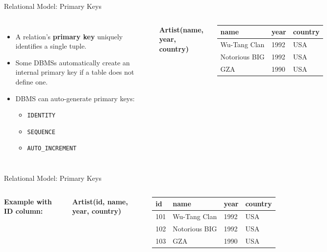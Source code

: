 \begin{frame}{Relational Model: Primary Keys}
    \begin{columns}
        \begin{itemize}
            \item A relation's \textbf{primary key} uniquely identifies a single tuple.
            \item Some DBMSs automatically create an internal primary key if a table does not define one.
            \item DBMS can auto-generate primary keys:
            \begin{itemize}
                \item \texttt{IDENTITY}
                \item \texttt{SEQUENCE}
                \item \texttt{AUTO\_INCREMENT}
            \end{itemize}
        \end{itemize}

        \small
        \textbf{Artist(name, year, country)}
        \begin{table}
        \begin{tabular}{lll}
        \toprule
        name & year & country \\
        \midrule
        Wu-Tang Clan & 1992 & USA \\
        Notorious BIG & 1992 & USA \\
        GZA & 1990 & USA \\
        \bottomrule
        \end{tabular}
        \end{table}
    \end{columns}
\end{frame}

\begin{frame}{Relational Model: Primary Keys}
    \begin{columns}
        \textbf{Example with ID column:}

        \small
        \textbf{Artist(id, name, year, country)}
        \begin{table}
        \begin{tabular}{llll}
        \toprule
        id & name & year & country \\
        \midrule
        101 & Wu-Tang Clan & 1992 & USA \\
        102 & Notorious BIG & 1992 & USA \\
        103 & GZA & 1990 & USA \\
        \bottomrule
        \end{tabular}
        \end{table}
    \end{columns}
\end{frame}

